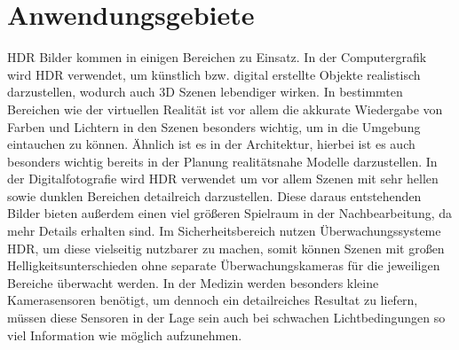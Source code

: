 \documentclass[conference]{IEEEtran}
\begin{document}
\section{Anwendungsgebiete}

	HDR Bilder kommen in einigen Bereichen zu Einsatz. In der Computergrafik wird HDR verwendet, um künstlich bzw. digital erstellte Objekte realistisch darzustellen, wodurch auch 3D Szenen lebendiger wirken. In bestimmten Bereichen wie der virtuellen Realität ist vor allem die akkurate Wiedergabe von Farben und Lichtern in den Szenen besonders wichtig, um in die Umgebung eintauchen zu können. Ähnlich ist es in der Architektur, hierbei ist es auch besonders wichtig bereits in der Planung realitätsnahe Modelle darzustellen. In der Digitalfotografie wird HDR verwendet um vor allem Szenen mit sehr hellen sowie dunklen Bereichen detailreich darzustellen. Diese daraus entstehenden Bilder bieten außerdem einen viel größeren Spielraum in der Nachbearbeitung, da mehr Details erhalten sind. Im Sicherheitsbereich nutzen Überwachungssysteme HDR, um diese vielseitig nutzbarer zu machen, somit können Szenen mit großen Helligkeitsunterschieden ohne separate Überwachungskameras für die jeweiligen Bereiche überwacht werden. In der Medizin werden besonders kleine Kamerasensoren benötigt, um dennoch ein detailreiches Resultat zu liefern, müssen diese Sensoren in der Lage sein auch bei schwachen Lichtbedingungen so viel Information wie möglich aufzunehmen.
\end{document}
